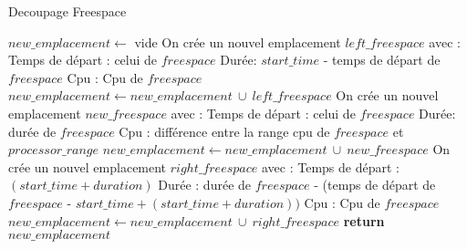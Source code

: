 \documentclass{report}
\begin{document}
\begin{algorithm}
\caption{Decoupage Freespace}\label{cut_freespace}
\begin{algorithmic}[1]
	\State $new\_emplacement \gets$ vide
	\State
		\State On crée un nouvel emplacement $left\_freespace$ avec :
			\State \hspace{\algorithmicindent} Temps de départ : celui de $freespace$
			\State \hspace{\algorithmicindent} Durée: $start\_time$ - temps de départ de $freespace$
			\State \hspace{\algorithmicindent} Cpu : Cpu de $freespace$
		\State $new\_emplacement \gets new\_emplacement\ \cup\ left\_freespace$ 
	\EndIf
	\State
		\State On crée un nouvel emplacement $new\_freespace$ avec :
			\State \hspace{\algorithmicindent} Temps de départ : celui de $freespace$
			\State \hspace{\algorithmicindent} Durée: durée de $freespace$
			\State \hspace{\algorithmicindent} Cpu : différence entre la range cpu de $freespace$ et $processor\_range$
		\State $new\_emplacement \gets new\_emplacement\ \cup\ new\_freespace$ 
	\EndIf
	\State
	\State On crée un nouvel emplacement $right\_freespace$ avec :
		\State \hspace{\algorithmicindent} Temps de départ : $(start\_time + duration)$
		\State \hspace{\algorithmicindent} Durée : durée de $freespace$ - (temps de départ de $freespace$ - $start\_time + (start\_time + duration))$
		\State \hspace{\algorithmicindent} Cpu : Cpu de $freespace$
	\State $new\_emplacement \gets new\_emplacement\ \cup\ right\_freespace$ 
	\State
	\State \textbf{return} $new\_emplacement$
\EndFunction
\end{algorithmic}
\end{algorithm}
\end{document}
